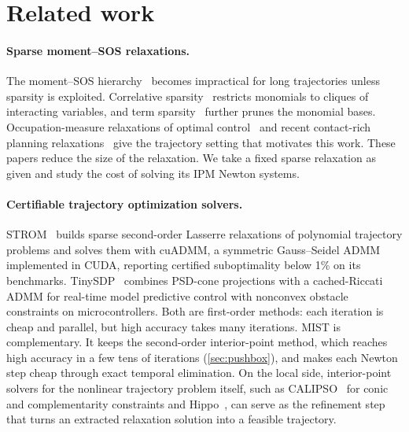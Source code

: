 \section{Related work}\label{sec:related}

\paragraph{Sparse moment--SOS relaxations.}
The moment--SOS hierarchy~\cite{lasserre2001global,parrilo2003semidefinite}
becomes impractical for long trajectories unless sparsity is exploited.
Correlative sparsity~\cite{waki2006sums,lasserre2006convergent} restricts
monomials to cliques of interacting variables, and term
sparsity~\cite{wang2021tssos,wang2022cstssos} further prunes the monomial bases.
Occupation-measure relaxations of optimal control~\cite{lasserre2008nonlinear}
and recent contact-rich planning relaxations~\cite{graesdal2024tight,kang2025spot}
give the trajectory setting that motivates this work. These papers reduce the
size of the relaxation. We take a fixed sparse relaxation as given and study the
cost of solving its IPM Newton systems.

\paragraph{Certifiable trajectory optimization solvers.}
STROM~\cite{kang2024strom} builds sparse second-order Lasserre relaxations of
polynomial trajectory problems and solves them with cuADMM, a symmetric
Gauss--Seidel ADMM implemented in CUDA, reporting certified suboptimality below
1\% on its benchmarks. TinySDP~\cite{mahajan2026tinysdp} combines PSD-cone
projections with a cached-Riccati ADMM for real-time model predictive control
with nonconvex obstacle constraints on microcontrollers. Both are first-order
methods: each iteration is cheap and parallel, but high accuracy takes many
iterations. MIST is complementary. It keeps the second-order interior-point
method, which reaches high accuracy in a few tens of iterations
(\cref{sec:pushbox}), and makes each Newton step cheap through exact temporal
elimination. On the local side, interior-point solvers for the nonlinear
trajectory problem itself, such as CALIPSO~\cite{howell2022calipso} for conic
and complementarity constraints and Hippo~\cite{zhao2026hippo}, can serve as
the refinement step that turns an extracted relaxation solution into a feasible
trajectory.

